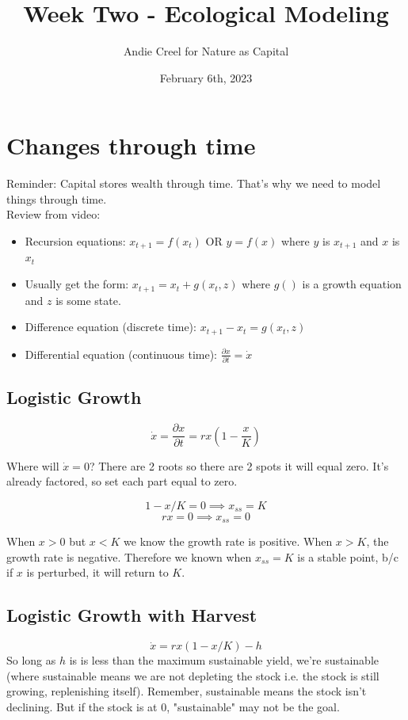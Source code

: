 \documentclass{article}
\title{Week Two - Ecological Modeling}
\author{Andie Creel for Nature as Capital}
\date{February 6th, 2023}
\begin{document}
\maketitle

\section{Changes through time}
Reminder: Capital stores wealth through time. That's why we need to model things through time.\\

Review from video:

\begin{itemize}
    \item Recursion equations: $x_{t+1} = f(x_t)$ OR $y = f(x)$ where $y$ is $x_{t+1}$ and $x$ is $x_t$
    \item Usually get the form: $x_{t+1} = x_t + g(x_t, z)$ where $g()$ is a growth equation and $z$ is some state.
    \item Difference equation (discrete time): $x_{t+1} - x_t = g(x_t, z)$
    \item Differential equation (continuous time):  $\frac{\partial x}{\partial t} = \dot x$
\end{itemize}

\subsection{Logistic Growth}

$$ \dot x = \frac{\partial x}{\partial t} = rx(1 - \frac{x}{K})$$

Where will $\dot x = 0$? There are 2 roots so there are 2 spots it will equal zero. It's already factored, so set each part equal to zero. 

$$ 1 - x/K = 0 \implies x_{ss} = K$$
$$ rx = 0 \implies x_{ss} = 0$$

When $x > 0$ but $ x < K$ we know the growth rate is positive. When $x > K$, the growth rate is negative. Therefore we known when $x_{ss} = K$ is a stable point, b/c if $x$ is perturbed, it will return to $K$. 

\subsection{Logistic Growth with Harvest}
$$ \dot x = rx(1 - x/K) - h$$
So long as $h$ is is less than the maximum sustainable yield, we're sustainable (where sustainable means we are not depleting the stock i.e. the stock is still growing, replenishing itself). Remember, sustainable means the stock isn't declining. But if the stock is at 0, "sustainable" may not be the goal. \\
\end{document}
